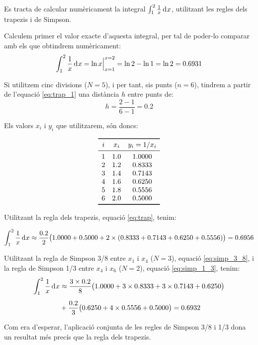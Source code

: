 \begin{exemple}\label{ex:IntegracioNum}
	\addcontentsxms{\IntegracioNum}
    Es tracta de calcular numèricament la integral $\int_1^2 \frac{1}{x} \diff x$, utilitzant les regles dels trapezis i de Simpson.

    Calculem primer el valor exacte d'aquesta integral, per tal de poder-lo comparar amb els que obtindrem  numèricament:
    \[
      \int_1^2 \frac{1}{x} \diff x = \ln x \Bigr|_{x=1}^{x=2} = \ln 2 - \ln 1 = \ln 2 = \num{0,6931}
    \]

    Si utilitzem cinc divisions ($N=5$), i per tant, sis punts ($n=6$), tindrem a partir de l'equació \eqref{eq:trap_1} una distància $h$ entre punts de:
    \[
        h = \frac{2-1}{6-1} = \num{0,2}
    \]

    Els valors $x_i$ i $y_i$ que utilitzarem, són doncs:
    \vspace{-8mm}
    \begin{center}
        \[\begin{array}{ccc}
           \toprule[1pt]
              i & x_i  & y_i = 1/x_i \\
           \midrule
              1 & \num{1,0} & \num{1,0000} \\
              2 & \num{1,2} & \num{0,8333} \\
              3 & \num{1,4} & \num{0,7143} \\
              4 & \num{1,6} & \num{0.6250} \\
              5 & \num{1,8} & \num{0.5556} \\
              6 & \num{2,0} & \num{0,5000} \\
           \bottomrule[1pt]
        \end{array} \]
    \end{center}

    \pagebreak
    Utilitzant la regla dels trapezis, equació \eqref{eq:trap}, tenim:

    \[
        \int_1^2 \frac{1}{x} \diff x \approx \frac{\num{0,2}}{2} \big(\num{1,0000}+\num{0,5000} +2 \times(\num{0,8333}+ \num{0,7143} +
        \num{0,6250} + \num{0,5556}) \big) = \num{0,6956}
    \]

    Utilitzant la regla de Simpson 3/8 entre $x_1$ i $x_4$ ($N=3$), equació \eqref{eq:simp_3_8}, i la  regla de Simpson 1/3 entre $x_4$ i $x_6$ ($N=2$), equació \eqref{eq:simp_1_3}, tenim:
    \[\begin{split}
        \int_1^2 \frac{1}{x} \diff x &\approx \frac{3\times\num{0,2}}{8} \big(\num{1,0000}+3\times\num{0,8333} +3\times \num{0,7143} +
        \num{0,6250} \big) \\[0.5em]
        {}&+ \frac{\num{0,2}}{3} \big(\num{0,6250} +4\times \num{0,5556} + \num{0,5000} \big)
        = \num{0,6932}
    \end{split}\]

    Com era d'esperar, l'aplicació conjunta de les regles de Simpson 3/8 i 1/3 dona un resultat més precís que la regla dels trapezis.
\end{exemple}


